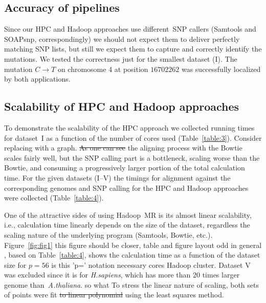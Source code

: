 \documentclass[11pt, oneside]{article}   	%
\newcommand{\COMMENT}[1]{{\color{red} #1 }}
\begin{document}
\subsection{Accuracy of pipelines}
Since our HPC and Hadoop approaches use different~SNP callers (Samtools and SOAPsnp, correspondingly) we should not expect them to deliver perfectly matching SNP lists, but still we expect them to capture and correctly identify the mutations. We tested the correctness just for the smallest dataset (I). The mutation $C\rightarrow T$ on chromosome 4 at position $16702262$\cite{schneeberger} was successfully localized by both applications.



\subsection{Scalability of HPC and Hadoop approaches}
To demonstrate the scalability of the HPC approach we collected running times for dataset~I as a function of the number of cores used (Table~\ref{table:3}). \COMMENT{Consider replacing with a graph.}
\sout{As one can see} the aligning process with the Bowtie scales fairly well, but the SNP calling part is a bottleneck, scaling worse than the Bowtie, and consuming a progressively larger portion of the total calculation time.
For the given datasets (I--V) the timings for alignment against the corresponding genomes and SNP calling for the HPC and Hadoop approaches were collected (Table~\ref{table:4}).

One of the attractive sides of using Hadoop~MR is its almost linear scalability, i.e., calculation time linearly depends on the size of the dataset\cite{crossbow,seal}, regardless the scaling nature of the underlying program (Samtools, Bowtie, etc.).
Figure~\ref{fig:fig1} \COMMENT{this figure should be closer, table and figure layout odd in general}, based on Table~\ref{table:4}, shows the calculation time as a function of the dataset size for $p=56$ \COMMENT{is this 'p=' notation necessary} cores Hadoop cluster. Dataset V was excluded since it is for {\it H.sapiens}, which has more than 20 times larger genome than~{\it A.thaliana}. \COMMENT{so what}
To stress the linear nature of scaling, both sets of points were fit \sout{to linear polynomial} using the least squares method.
\end{document}
